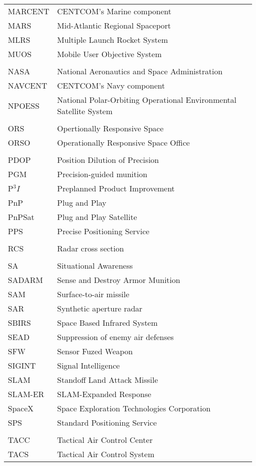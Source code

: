 \begin{supertabular}{ll}
MARCENT & CENTCOM's Marine component \\
MARS & Mid-Atlantic Regional Spaceport \\
MLRS & Multiple Launch Rocket System \\
MUOS & Mobile User Objective System \\
\\
NASA & National Aeronautics and Space Administration \\
NAVCENT & CENTCOM's Navy component \\
NPOESS & National Polar-Orbiting Operational Environmental Satellite System \\
\\
ORS & Opertionally Responsive Space \\
ORSO & Operationally Responsive Space Office \\
\\
PDOP & Position Dilution of Precision \\
PGM & Precision-guided munition \\
P$^{3}I$ & Preplanned Product Improvement \\
PnP & Plug and Play \\
PnPSat & Plug and Play Satellite \\
PPS & Precise Positioning Service \\
\\
RCS & Radar cross section \\
\\
SA & Situational Awareness \\
SADARM & Sense and Destroy Armor Munition \\
SAM & Surface-to-air missile \\
SAR & Synthetic aperture radar \\
SBIRS & Space Based Infrared System \\
SEAD & Suppression of enemy air defenses \\
SFW & Sensor Fuzed Weapon \\
SIGINT & Signal Intelligence \\
SLAM & Standoff Land Attack Missile \\
SLAM-ER & SLAM-Expanded Response \\
SpaceX & Space Exploration Technologies Corporation \\
SPS & Standard Positioning Service \\
\\
TACC & Tactical Air Control Center \\
TACS & Tactical Air Control System \\

\end{supertabular}
